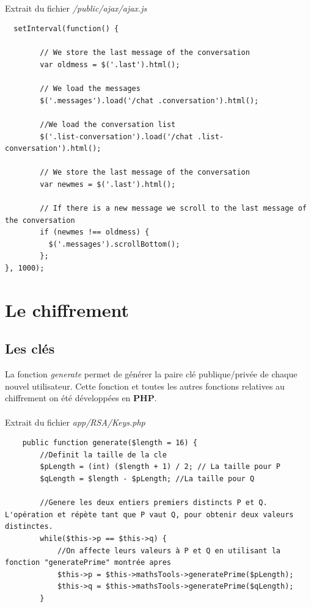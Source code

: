 \documentclass[12pt,a4paper]{report}
\begin{document}
\begin{itemize}
\paragraph{}
Extrait du fichier \textit{/public/ajax/ajax.js}
\lstset{}
\begin{lstlisting}
  setInterval(function() {
        
        // We store the last message of the conversation
        var oldmess = $('.last').html();
        
        // We load the messages
        $('.messages').load('/chat .conversation').html();
        
        //We load the conversation list
        $('.list-conversation').load('/chat .list-conversation').html();
        
        // We store the last message of the conversation
        var newmes = $('.last').html();
        
        // If there is a new message we scroll to the last message of the conversation
        if (newmes !== oldmess) {
          $('.messages').scrollBottom();
        };
}, 1000);
\end{lstlisting}

\newpage
\section{Le chiffrement}
\subsection{Les clés}
La fonction \textit{generate} permet de générer la paire clé publique/privée de chaque nouvel utilisateur. Cette fonction et toutes les autres fonctions relatives au chiffrement on été développées en \textbf{PHP}.
\paragraph{}
Extrait du fichier \textit{app/RSA/Keys.php}

\lstset{}
\begin{lstlisting}
    public function generate($length = 16) {
        //Definit la taille de la cle
        $pLength = (int) ($length + 1) / 2; // La taille pour P
        $qLength = $length - $pLength; //La taille pour Q
        
        //Genere les deux entiers premiers distincts P et Q. L'opération et répète tant que P vaut Q, pour obtenir deux valeurs distinctes.
        while($this->p == $this->q) {
            //On affecte leurs valeurs à P et Q en utilisant la fonction "generatePrime" montrée apres
            $this->p = $this->mathsTools->generatePrime($pLength); 
            $this->q = $this->mathsTools->generatePrime($qLength);
        }
        

\end{lstlisting}
\end{itemize}
\end{document}

